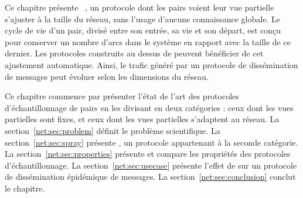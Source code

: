 Ce chapitre présente \SPRAY~\cite{nedelec2015spray}, un protocole dont les pairs
voient leur vue partielle s'ajuster à la taille du réseau, sans l'usage d'aucune
connaissance globale. Le cycle de vie d'un pair, divisé entre son entrée, sa vie
et son départ, est conçu pour conserver un nombre d'arcs dans le système en
rapport avec la taille de ce dernier. Les protocoles construits au dessus de
\SPRAY peuvent bénéficier de cet ajustement automatique. Ainsi, le trafic
généré par un protocole de dissémination de messages peut évoluer selon les
dimensions du réseau.

Ce chapitre commence par présenter l'état de l'art des protocoles
d'échantillonnage de pairs en les divisant en deux catégories : ceux dont les
vues partielles sont fixes, et ceux dont les vues partielles s'adaptent au
réseau. La section~\ref{net:sec:problem} définit le problème scientifique.  La
section~\ref{net:sec:spray} présente \SPRAY, un protocole appartenant à la
seconde catégorie. La section~\ref{net:sec:properties} présente et compare les
propriétés des protocoles d'échantillonnage. La section~\ref{net:sec:usecase}
présente l'effet de \SPRAY sur un protocole de dissémination épidémique de
messages. La section~\ref{net:sec:conclusion} conclut le chapitre.

